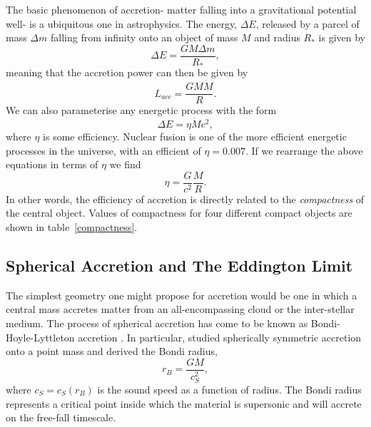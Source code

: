 The basic phenomenon of accretion- matter falling into a gravitational potential well- 
is a ubiquitous one in astrophysics. The energy, $\Delta E$, released by a parcel of 
mass $\Delta m$ falling from infinity onto an object of mass $M$ and radius $R_*$
is given by
\begin{equation}
\Delta E = \frac{GM \Delta m}{R_*},
\label{eq:acc_energy}
\end{equation} 
meaning that the accretion power can then be given by
\begin{equation}
L_{acc} = \frac{GM \dot{M}}{R}.
\label{eq:acc_energy}
\end{equation} 
We can also parameterise any energetic process with the form
\begin{equation}
\Delta E = \eta \dot{M} c^2,
\label{eq:restmass}
\end{equation} 
where $\eta$ is some efficiency. Nuclear fusion is one of the more efficient
energetic processes in the universe, with an efficient of
$\eta=0.007$. If we rearrange the above equations in terms of $\eta$ we find
\begin{equation}
\eta = \frac{G}{c^2} \frac{M}{R}.
\label{eq:eta}
\end{equation} 
In other words, the efficiency of accretion is directly related to the {\em compactness}
of the central object. Values of compactness for four different compact objects
are shown in table~\ref{compactness}. 

\subsection{Spherical Accretion and The Eddington Limit}

The simplest geometry one might propose for accretion
would be one in which a central mass accretes matter from
an all-encompassing cloud or the inter-stellar medium.
The process of spherical accretion has come to be known as 
Bondi-Hoyle-Lyttleton accretion \citep{hoyle1939,bondi1944}.
In particular, \cite{bondi1952} studied spherically symmetric 
accretion onto a point mass and derived the Bondi radius,
\begin{equation}
r_B = \frac{G M}{c_S^2},
\label{eq:bondi}
\end{equation} 
where $c_S = c_S(r_B)$ is the sound speed as a function of radius.
The Bondi radius represents a critical point inside which the material
is supersonic and will accrete on the free-fall timescale.

